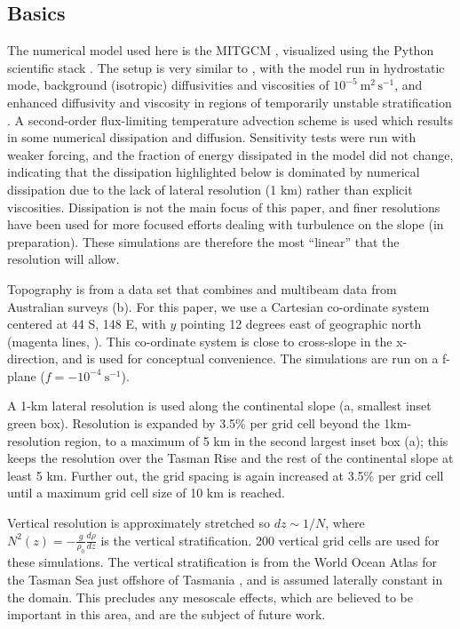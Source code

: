 \documentclass[12pt]{article}
\begin{document}
\subsection{Basics}

The numerical model used here is the MITGCM \citep{marshalletal97}, visualized using the Python scientific stack \citep{hunter07,vanderwaltetal11}. The setup is very similar to \citet{buijsmanetal14}, with the model run in hydrostatic mode, background (isotropic) diffusivities and viscosities of $10^{-5}\ \mathrm{m^2\,s^{-1}}$, and enhanced diffusivity and viscosity in regions of temporarily unstable stratification \citep{klymaklegg10}.  A second-order flux-limiting temperature advection scheme is used which results in some numerical dissipation and diffusion.  Sensitivity tests were run with weaker forcing, and the fraction of energy dissipated in the model did not change, indicating that the dissipation highlighted below is dominated by numerical dissipation due to the lack of lateral resolution (1 km) rather than explicit viscosities. Dissipation is not the main focus of this paper, and finer resolutions have been used for more focused efforts dealing with turbulence on the slope (in preparation).  These simulations are therefore the most ``linear'' that the resolution will allow.  

Topography is from a data set that combines \citet{smithsandwell97} and multibeam data from Australian surveys \citep{Whiteway09a} (b).  For this paper, we use a Cartesian co-ordinate system centered at 44 S, 148 E, with $y$ pointing 12 degrees east of geographic north (magenta lines, ).  This co-ordinate system is close to cross-slope in the x-direction, and is used for conceptual convenience.  The simulations are run on a f-plane ($f=-10^{-4}\ \mathrm{s^{-1}}$).  

A 1-km lateral resolution is used along the continental slope (a, smallest inset green box).  Resolution is expanded by 3.5\% per grid cell beyond the 1km-resolution region, to a maximum of 5 km in the second largest inset box (a); this keeps the resolution over the Tasman Rise and the rest of the continental slope at least 5 km.  Further out, the grid spacing is again increased at 3.5\% per grid cell until a maximum grid cell size of 10 km is reached.  

Vertical resolution is approximately stretched so $dz\sim 1/N$, where $N^2(z)=-\frac{g}{\rho_0}\frac{d\rho}{dz}$ is the vertical stratification.  200 vertical grid cells are used for these simulations. The vertical stratification is from the World Ocean Atlas for the Tasman Sea just offshore of Tasmania \citep{woa13}, and is assumed laterally constant in the domain.  This precludes any mesoscale effects, which are believed to be important in this area, and are the subject of future work.
\end{document}
